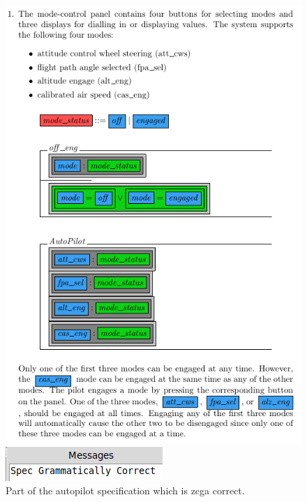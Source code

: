 \begin{figure}[H]
     \centering
     \begin{minipage}{0.45\textwidth}
     \centering
     \includegraphics[width=\linewidth]{Figures/fullexample/sfzcgacorrect.png}
     \end{minipage}\hfill
     \begin{minipage}{0.45\textwidth}
     \centering
     \includegraphics[width=\linewidth]{Figures/fullexample/semiformcorrect.png}
     \end{minipage}
     \caption{Part of the autopilot specification which is \gls{zcga} correct.\label{fig:sfzcgacorrect}}
     \end{figure}


